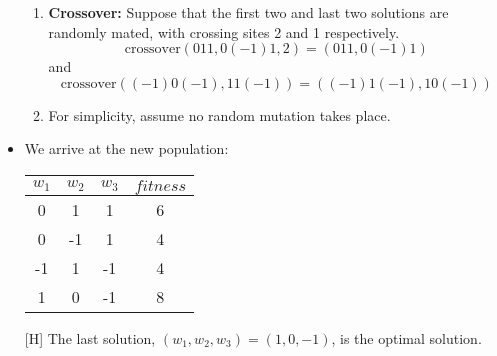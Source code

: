 \documentclass[12pt]{article}
\begin{document}
\begin{Q}
\begin{itemize}
\begin{enumerate}
    \item \textbf{Crossover:} Suppose that the first two and last two solutions are randomly mated, with crossing sites 2 and 1 respectively.
    \[
        \text{crossover}(011, 0(-1)1, 2) = (011, 0(-1)1)
    \]
    and
    \[
        \text{crossover}((-1)0(-1), 11(-1)) = ((-1)1(-1), 10(-1))
    \]

    \item For simplicity, assume no random mutation takes place.
\end{enumerate}

\item We arrive at the new population:
\begin{table}[H]\centering
\begin{tabular}{ccc|c}
    $w_1$ & $w_2$ & $w_3$ & $fitness$ \\ \hline
    0 & 1 & 1 & 6 \\
    0 & -1 & 1 & 4 \\
    -1 & 1 & -1 & 4 \\
    1 & 0 & -1 & 8
\end{tabular}
\end{table}[H]
The last solution, $(w_1, w_2, w_3) = (1, 0, -1)$, is the optimal solution.

\end{itemize}



\end{Q}
\end{document}
